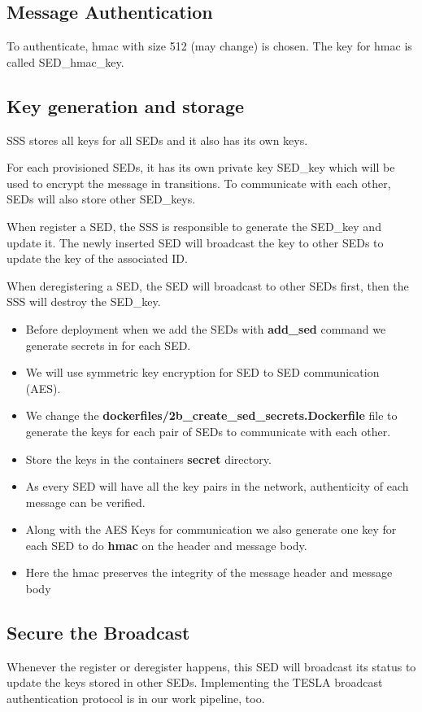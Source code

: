 \documentclass[11pt,oneside,onecolumn,letterpaper]{article}
\begin{document}
\subsection{Message Authentication}
To authenticate, hmac with size 512 (may change) is chosen.
The key for hmac is called SED\_hmac\_key.

\subsection{Key generation and storage}
SSS stores all keys for all SEDs and it also has its own keys.

For each provisioned SEDs, it has its own private key SED\_key which will be used to encrypt the message in transitions.
To communicate with each other, SEDs will also store other SED\_keys.

When register a SED, the SSS is responsible to generate the SED\_key and update it.
The newly inserted SED will broadcast the key to other SEDs to update the key of the associated ID.

When deregistering a SED, the SED will broadcast to other SEDs first, then the SSS will destroy the SED\_key.

  \begin{itemize}
  \item Before deployment when we add the SEDs with \textbf{add\_sed}  
      command we generate secrets in for each SED. 
      \item We will use symmetric key encryption for SED to SED communication (AES).
      \item We change the  \textbf{dockerfiles/2b\_create\_sed\_secrets.Dockerfile} file to generate the keys for each pair of SEDs to communicate with each other.
      \item Store the keys in the containers \textbf{secret} directory.
      \item As every SED will have all the key pairs in the network, authenticity of each message can be verified.
      \item Along with the AES Keys for communication we also generate one key for each SED to do \textbf{hmac} on the header and message body. 
      \item Here the hmac preserves the integrity of the message header and message body
  \end{itemize}

\subsection{Secure the Broadcast}
Whenever the register or deregister happens, this SED will broadcast its status to update the keys stored in other SEDs.
Implementing the TESLA broadcast authentication protocol is in our work pipeline, too.
\end{document}
